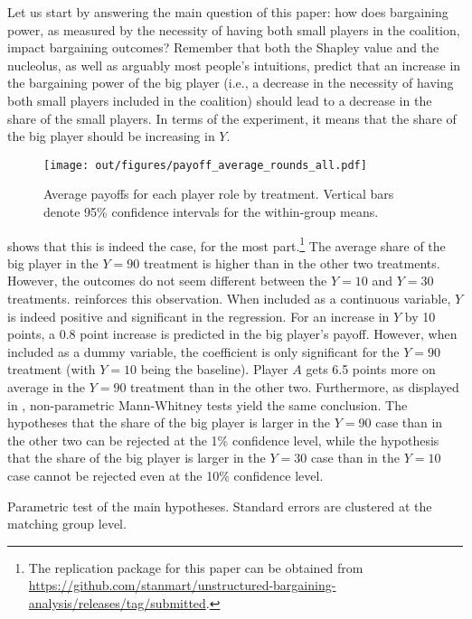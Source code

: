 Let us start by answering the main question of this paper: how does bargaining power, as measured by the necessity of having both small players in the coalition, impact bargaining outcomes? Remember that both the Shapley value and the nucleolus, as well as arguably most people's intuitions, predict that an increase in the bargaining power of the big player (i.e., a decrease in the necessity of having both small players included in the coalition) should lead to a decrease in the share of the small players. In terms of the experiment, it means that the share of the big player should be increasing in $Y$.

\begin{figure}
    \centering
    \texttt{[image: out/figures/payoff\_average\_rounds\_all.pdf]}
    \caption{Average payoffs for each player role by treatment. Vertical bars denote 95\% confidence intervals for the within-group means.}
    \label{fig:main_means}
\end{figure}

 shows that this is indeed the case, for the most part.\footnote{The replication package for this paper can be obtained from  \\\href{https://github.com/stanmart/unstructured-bargaining-analysis/releases/tag/submitted}{https://github.com/stanmart/unstructured-bargaining-analysis/releases/tag/submitted}.} The average share of the big player in the $Y=90$ treatment is higher than in the other two treatments. However, the outcomes do not seem different between the $Y=10$ and $Y=30$ treatments.  reinforces this observation. When included as a continuous variable, $Y$ is indeed positive and significant in the regression. For an increase in $Y$ by 10 points, a 0.8 point increase is predicted in the big player's payoff. However, when included as a dummy variable, the coefficient is only significant for the $Y=90$ treatment (with $Y=10$ being the baseline). Player $A$ gets 6.5 points more on average in the $Y=90$ treatment than in the other two. Furthermore, as displayed in , non-parametric Mann-Whitney tests yield the same conclusion. The hypotheses that the share of the big player is larger in the $Y=90$ case than in the other two can be rejected at the 1\% confidence level, while the hypothesis that the share of the big player is larger in the $Y=30$ case than in the $Y=10$ case cannot be rejected even at the 10\% confidence level.

\begin{table}
    \centering
    
    \caption{Parametric test of the main hypotheses. Standard errors are clustered at the matching group level.}
    \label{tab:main_regressions}
\end{table}


